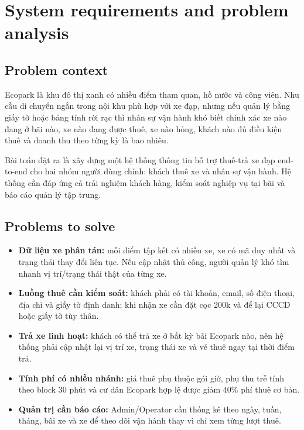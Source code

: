 \section{System requirements and problem analysis}

\subsection{Problem context}
Ecopark là khu đô thị xanh có nhiều điểm tham quan, hồ nước và công viên. Nhu cầu
di chuyển ngắn trong nội khu phù hợp với xe đạp, nhưng nếu quản lý bằng giấy tờ
hoặc bảng tính rời rạc thì nhân sự vận hành khó biết chính xác xe nào đang ở bãi
nào, xe nào đang được thuê, xe nào hỏng, khách nào đủ điều kiện thuê và doanh thu
theo từng kỳ là bao nhiêu.

Bài toán đặt ra là xây dựng một hệ thống thông tin hỗ trợ thuê-trả xe đạp end-to-end
cho hai nhóm người dùng chính: khách thuê xe và nhân sự vận hành. Hệ thống cần
đáp ứng cả trải nghiệm khách hàng, kiểm soát nghiệp vụ tại bãi và báo cáo quản lý
tập trung.

\subsection{Problems to solve}
\begin{itemize}
  \item \textbf{Dữ liệu xe phân tán:} mỗi điểm tập kết có nhiều xe, xe có mã duy
  nhất và trạng thái thay đổi liên tục. Nếu cập nhật thủ công, người quản lý khó
  tìm nhanh vị trí/trạng thái thật của từng xe.
  \item \textbf{Luồng thuê cần kiểm soát:} khách phải có tài khoản, email, số điện
  thoại, địa chỉ và giấy tờ định danh; khi nhận xe cần đặt cọc 200k và để lại
  CCCD hoặc giấy tờ tùy thân.
  \item \textbf{Trả xe linh hoạt:} khách có thể trả xe ở bất kỳ bãi Ecopark nào,
  nên hệ thống phải cập nhật lại vị trí xe, trạng thái xe và vé thuê ngay tại
  thời điểm trả.
  \item \textbf{Tính phí có nhiều nhánh:} giá thuê phụ thuộc gói giờ, phụ thu trễ
  tính theo block 30 phút và cư dân Ecopark hợp lệ được giảm 40\% phí thuê cơ bản.
  \item \textbf{Quản trị cần báo cáo:} Admin/Operator cần thống kê theo ngày,
  tuần, tháng, bãi xe và xe để theo dõi vận hành thay vì chỉ xem từng lượt thuê.
\end{itemize}

